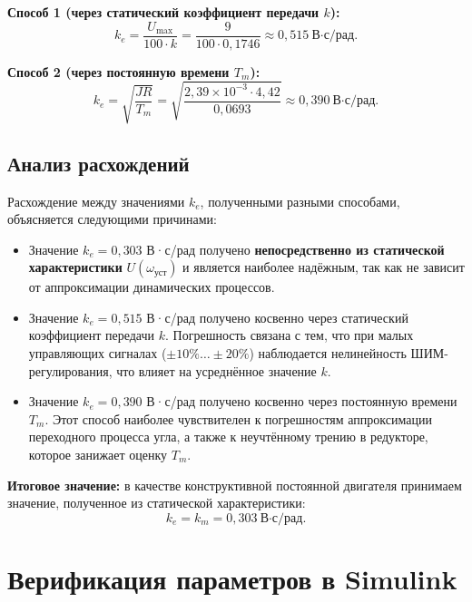 \documentclass[a4paper, 12pt]{article}
\begin{document}
\textbf{Способ 1 (через статический коэффициент передачи $k$):}
\begin{equation}
    k_e = \frac{U_{\text{max}}}{100 \cdot k} = \frac{9}{100 \cdot 0,1746} \approx 0,515\ \text{В·с/рад}.
\end{equation}

\textbf{Способ 2 (через постоянную времени $T_m$):}
\begin{equation}
    k_e = \sqrt{\frac{JR}{T_m}} = \sqrt{\frac{2,39 \times 10^{-3} \cdot 4,42}{0,0693}} \approx 0,390\ \text{В·с/рад}.
\end{equation}

\subsection{Анализ расхождений}

Расхождение между значениями $k_e$, полученными разными способами, объясняется следующими причинами:

\begin{itemize}
    \item Значение $k_e = 0,303$ В·с/рад получено \textbf{непосредственно из статической характеристики} $U(\omega_{\text{уст}})$ и является наиболее надёжным, так как не зависит от аппроксимации динамических процессов.

    \item Значение $k_e = 0,515$ В·с/рад получено косвенно через статический коэффициент передачи $k$. Погрешность связана с тем, что при малых управляющих сигналах ($\pm10\%\ldots\pm20\%$) наблюдается нелинейность ШИМ-регулирования, что влияет на усреднённое значение $k$.

    \item Значение $k_e = 0,390$ В·с/рад получено косвенно через постоянную времени $T_m$. Этот способ наиболее чувствителен к погрешностям аппроксимации переходного процесса угла, а также к неучтённому трению в редукторе, которое занижает оценку $T_m$.
\end{itemize}

\textbf{Итоговое значение:} в качестве конструктивной постоянной двигателя принимаем
значение, полученное из статической характеристики:
\begin{equation}
    \boxed{k_e = k_m = 0,303\ \text{В·с/рад}}.
\end{equation}

\section{Верификация параметров в Simulink}
\end{document}
